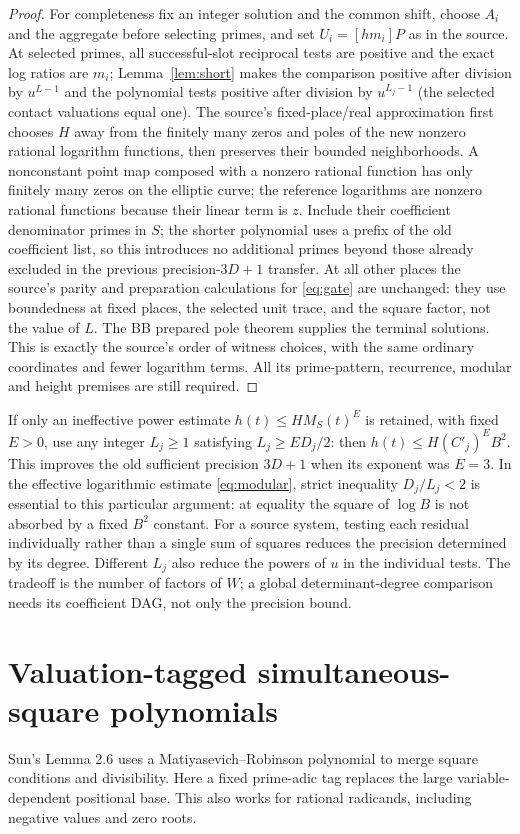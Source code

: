 \documentclass[11pt]{article}
\begin{document}
\begin{proof}
For completeness fix an integer solution and the common shift,
choose $A_i$ and the aggregate before selecting primes, and set
$U_i=[hm_i]P$ as in the source. At selected primes, all successful-slot
reciprocal tests are positive and the exact log ratios are $m_i$;
Lemma~\ref{lem:short} makes the comparison positive after division
by $u^{L-1}$ and the polynomial tests positive after division by
$u^{L_j-1}$ (the selected contact valuations equal one).
The source's fixed-place/real approximation first chooses $H$ away
from the finitely many zeros and poles of the new nonzero rational
logarithm functions, then preserves their bounded neighborhoods.
A nonconstant point map composed with a nonzero rational function
has only finitely many zeros on the elliptic curve; the reference
logarithms are nonzero rational functions because their linear term
is $z$. Include their coefficient denominator primes in $S$; the
shorter polynomial uses a prefix of the old coefficient list, so
this introduces no additional primes beyond those already excluded
in the previous precision-$3D+1$ transfer. At all other places the
source's parity and preparation calculations for \eqref{eq:gate}
are unchanged: they use boundedness at fixed places, the selected
unit trace, and the square factor, not the value of $L$. The BB
prepared pole theorem supplies the terminal solutions. This is
exactly the source's order of witness choices, with the same
ordinary coordinates and fewer logarithm terms. All its prime-pattern,
recurrence, modular and height premises are still required.
\end{proof}

If only an ineffective power estimate $h(t)\le H M_S(t)^E$ is retained,
with fixed $E>0$, use any integer $L_j\ge1$ satisfying $L_j\ge ED_j/2$:
then $h(t)\le H (C'_j)^E B^2$. This improves the old sufficient
precision $3D+1$ when its exponent was $E=3$. In the effective
logarithmic estimate \eqref{eq:modular}, strict inequality $D_j/L_j<2$
is essential to this particular argument: at equality the square of
$\log B$ is not absorbed by a fixed $B^2$ constant. For a source system,
testing each residual individually rather than a single sum of squares
reduces the precision determined by its degree. Different $L_j$ also
reduce the powers of $u$ in the individual tests. The tradeoff is the
number of factors of $W$; a global determinant-degree comparison needs
its coefficient DAG, not only the precision bound.

\section{Valuation-tagged simultaneous-square polynomials}\label{sec:square}
Sun's Lemma 2.6 uses a Matiyasevich--Robinson polynomial to merge square
conditions and divisibility. Here a fixed prime-adic tag replaces the
large variable-dependent positional base. This also works for rational
radicands, including negative values and zero roots.
\end{document}
